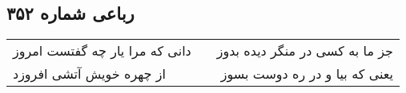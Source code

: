 \begin{center}
\section*{رباعی شماره ۳۵۲}
\label{sec:sh352}
\begin{longtable}{l p{0.5cm} r}
دانی که مرا یار چه گفتست امروز
&&
جز ما به کسی در منگر دیده بدوز
\\
از چهره خویش آتشی افروزد
&&
یعنی که بیا و در ره دوست بسوز
\\
\end{longtable}
\end{center}
